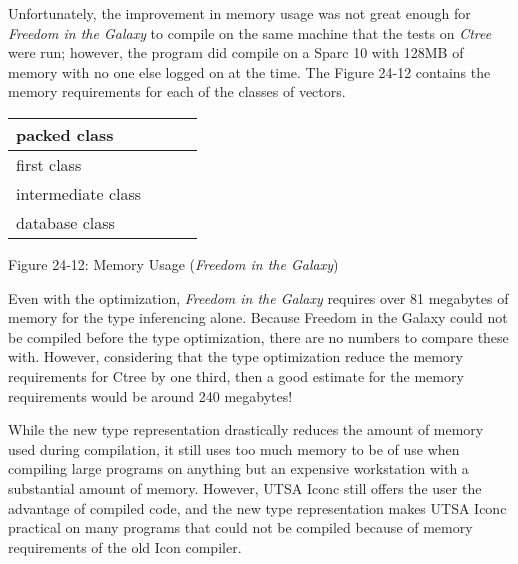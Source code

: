 Unfortunately, the improvement in memory usage was not great enough
for \textit{Freedom in the Galaxy} to compile on the same machine that
the tests on \textit{Ctree} were run; however, the program did compile
on a Sparc 10 with 128MB of memory with no one else logged on at the
time. The Figure 24-12 contains the memory requirements for each of
the classes of vectors.

\begin{center}
\tabletail{}
\tablelasttail{}
\begin{supertabular}{|m{1.2288599in}|m{1.2170599in}|m{1.2427598in}|m{1.6538599in}|}
\hline
 packed class &
 &
 &
\raggedleft{}\\\hline
 first class &
 &
 &
\raggedleft{}\\\hline
 intermediate class &
 &
 &
\raggedleft{}\\\hline
 database class &
 &
 &
\raggedleft{}\\\hline
\end{supertabular}
\end{center}
{\centering{}
Figure 24-12: Memory Usage (\textit{Freedom in the Galaxy})
\par}


Even with the optimization, \textit{Freedom in the Galaxy} requires
over 81 megabytes of memory for the type inferencing alone. Because
Freedom in the Galaxy could not be compiled before the type
optimization, there are no numbers to compare these with. However,
considering that the type optimization reduce the memory requirements
for Ctree by one third, then a good estimate for the memory
requirements would be around 240 megabytes!

While the new type representation drastically reduces the amount of
memory used during compilation, it still uses too much memory to be of
use when compiling large programs on anything but an expensive
workstation with a substantial amount of memory. However, UTSA Iconc
still offers the user the advantage of compiled code, and the new type
representation makes UTSA Iconc practical on many programs that could
not be compiled because of memory requirements of the old Icon
compiler.

